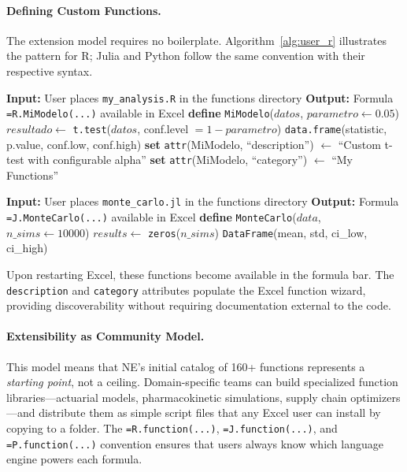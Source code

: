 \documentclass[preprint,12pt,authoryear]{elsarticle}
\providecommand{\KwInput}[1]{\textbf{Input:} #1}
\providecommand{\KwOutput}[1]{\textbf{Output:} #1}
\newcommand{\neven}{NE\raisebox{0.2ex}{v}\rotatebox[origin=c]{180}{E}\rotatebox[origin=c]{180}{N}}
\begin{document}
\paragraph{Defining Custom Functions.}
The extension model requires no boilerplate. Algorithm~\ref{alg:user_r} illustrates the pattern for R; Julia and Python follow the same convention with their respective syntax.

\begin{algorithm}[htbp]
\SetAlgoLined
\KwInput{User places \texttt{my\_analysis.R} in the functions directory}
\KwOutput{Formula \texttt{=R.MiModelo(...)} available in Excel}
\BlankLine
\textbf{define} \texttt{MiModelo}($datos$, $parametro \leftarrow 0.05$)\;
\Indp
    $resultado \leftarrow$ \texttt{t.test}($datos$, conf.level $= 1 - parametro$)\;
    \Return \texttt{data.frame}(statistic, p.value, conf.low, conf.high)\;
\Indm
\BlankLine
\textbf{set} \texttt{attr}(MiModelo, ``description'') $\leftarrow$ ``Custom t-test with configurable alpha''\;
\textbf{set} \texttt{attr}(MiModelo, ``category'') $\leftarrow$ ``My Functions''\;
\caption{User-Defined R Function (automatically exposed as \texttt{=R.MiModelo(...)})}
\label{alg:user_r}
\end{algorithm}

\begin{algorithm}[htbp]
\SetAlgoLined
\KwInput{User places \texttt{monte\_carlo.jl} in the functions directory}
\KwOutput{Formula \texttt{=J.MonteCarlo(...)} available in Excel}
\BlankLine
\textbf{define} \texttt{MonteCarlo}($data$, $n\_sims \leftarrow 10000$)\;
\Indp
    $results \leftarrow$ \texttt{zeros}($n\_sims$)\;
    \Return \texttt{DataFrame}(mean, std, ci\_low, ci\_high)\;
\Indm
\caption{User-Defined Julia Function (automatically exposed as \texttt{=J.MonteCarlo(...)})}
\label{alg:user_jl}
\end{algorithm}

Upon restarting Excel, these functions become available in the formula bar. The \texttt{description} and \texttt{category} attributes populate the Excel function wizard, providing discoverability without requiring documentation external to the code.

\paragraph{Extensibility as Community Model.}
This model means that \neven{}'s initial catalog of 160+ functions represents a \emph{starting point}, not a ceiling. Domain-specific teams can build specialized function libraries---actuarial models, pharmacokinetic simulations, supply chain optimizers---and distribute them as simple script files that any Excel user can install by copying to a folder. The \texttt{=R.function(...)}, \texttt{=J.function(...)}, and \texttt{=P.function(...)} convention ensures that users always know which language engine powers each formula.
\end{document}
